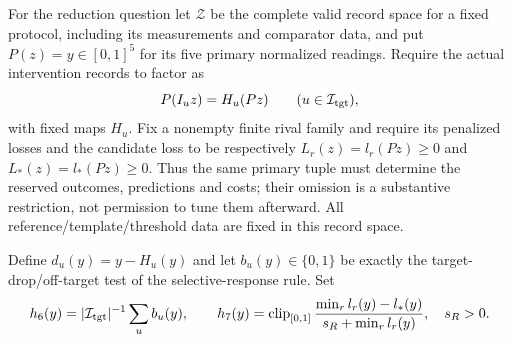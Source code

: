 \documentclass[11pt,a4paper]{article}
\theoremstyle{definition}
\begin{document}
For the reduction question let $\mathcal Z$ be the complete valid record
space for a fixed protocol, including its measurements and comparator data,
and put $P(z)=y\in[0,1]^5$ for its five primary normalized readings. Require
the actual intervention records to factor as
\[
 P(I_u z)=H_u(Pz)\qquad(u\in\mathcal I_{\rm tgt}),
\]
with fixed maps $H_u$. Fix a nonempty finite rival family and require its
penalized losses and the candidate loss to be respectively
$L_r(z)=l_r(Pz)\ge0$ and $L_*(z)=l_*(Pz)\ge0$. Thus the same primary tuple
must determine the reserved outcomes, predictions and costs; their omission
is a substantive restriction, not permission to tune them afterward.
All reference/template/threshold data are fixed in this record space.

Define $d_u(y)=y-H_u(y)$ and let $b_u(y)\in\{0,1\}$ be exactly the
target-drop/off-target test of the selective-response rule. Set
\[
 h_6(y)=|\mathcal I_{\rm tgt}|^{-1}\sum_u b_u(y),\qquad
 h_7(y)=\operatorname{clip}_{[0,1]}
 \frac{\min_r l_r(y)-l_*(y)}{s_R+\min_r l_r(y)},\quad s_R>0.
\]
\end{document}
